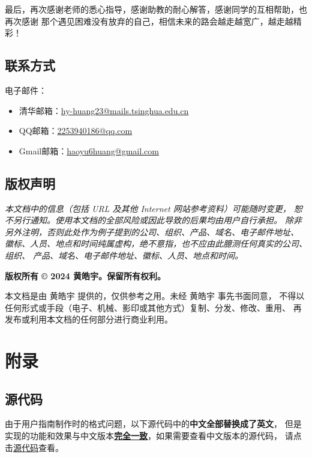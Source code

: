 \documentclass[12pt,twoside]{ctexart}
\begin{document}
最后，再次感谢老师的悉心指导，感谢助教的耐心解答，感谢同学的互相帮助，也再次感谢
那个遇见困难没有放弃的自己，相信未来的路会越走越宽广，越走越精彩！

\newpage
\subsection{联系方式}

电子邮件：
\begin{itemize}
    \item 清华邮箱：\href{mailto:hy-huang23@mails.tsinghua.edu.cn}{hy-huang23@mails.tsinghua.edu.cn}
    \item QQ邮箱：\href{mailto:2253940186@qq.com}{2253940186@qq.com}
    \item Gmail邮箱：\href{mailto:haoyu6huang@gmail.com}{haoyu6huang@gmail.com}
\end{itemize}

\newpage
\subsection{版权声明}

\textit{本文档中的信息（包括 URL 及其他 Internet 网站参考资料）可能随时变更，
    恕不另行通知。使用本文档的全部风险或因此导致的后果均由用户自行承担。
    除非另外注明，否则此处作为例子提到的公司、组织、产品、域名、电子邮件地址、
    徽标、人员、地点和时间纯属虚构，绝不意指，也不应由此臆测任何真实的公司、组织、
    产品、域名、电子邮件地址、徽标、人员、地点和时间。}

\textbf{版权所有 © 2024 黄皓宇。保留所有权利。}

本文档是由 黄皓宇 提供的，仅供参考之用。未经 黄皓宇 事先书面同意，
不得以任何形式或手段（电子、机械、影印或其他方式）复制、分发、修改、重用、
再发布或利用本文档的任何部分进行商业利用。


\newpage
\section{附录}

\subsection{源代码}
由于用户指南制作时的格式问题，以下源代码中的\textbf{中文全部替换成了英文}，
但是实现的功能和效果与中文版本\underline{\textbf{完全一致}}，如果需要查看中文版本的源代码，
请点击\href{https://github.com/Alex-hwang/BookManagementSystem}{\underline{源代码}}查看。
\end{document}
